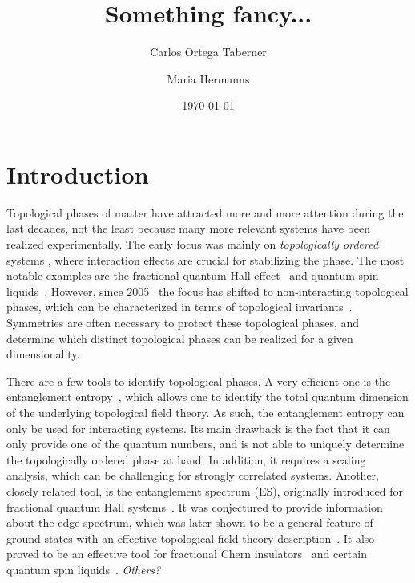 \documentclass[twocolumn,amsmath,longbibliography,amssymb,superscriptaddress]{revtex4-1}
\newcommand{\mariac}[1]{{\it\color{cyan}#1}}
\begin{document}
		
\title{Something fancy...}
\author{Carlos Ortega Taberner}

\author{Maria Hermanns}
\date{\today}
		
\maketitle
	


\section{Introduction}
Topological phases of matter have attracted more and more attention during the last decades, not the least because many more relevant systems have been realized experimentally. 
The early focus was mainly on \emph{topologically ordered} systems \cite{wenbook}, where interaction effects are crucial for stabilizing the phase. 
The most notable examples are the fractional quantum Hall effect~\cite{Tsui1982} and quantum spin liquids~\cite{Balents2010spin}. 
However, since 2005~\cite{kane2005quantum,roy2009topological} the focus has shifted to non-interacting topological phases, which can be characterized in terms of topological invariants~\cite{ryu2010topological}. 
Symmetries are often necessary to protect these topological phases, and determine which distinct topological phases can be realized for a given dimensionality. 

There are a few tools to identify topological phases. 
A very efficient one is the entanglement entropy~\cite{}, which allows one to identify the total quantum dimension of the underlying topological field theory. 
As such, the entanglement entropy can only be used for interacting systems. 
Its main drawback is the fact that it can only provide one of the quantum numbers, and is not able to uniquely determine the topologically ordered phase at hand. 
In addition, it requires a scaling analysis, which can be challenging for strongly correlated systems. 
Another, closely related tool, is the entanglement spectrum (ES), originally introduced for fractional quantum Hall systems~\cite{Li2008entanglement}. 
It was conjectured to provide information about the edge spectrum, which was later shown to be a general feature of ground states with an effective topological field theory description~\cite{Qi2012general}. 
It also proved to be an effective tool for fractional Chern insulators~\cite{Regnault2011fractional} and certain quantum spin liquids~\cite{yao2010entanglement}. \mariac{Others?}
\end{document}
